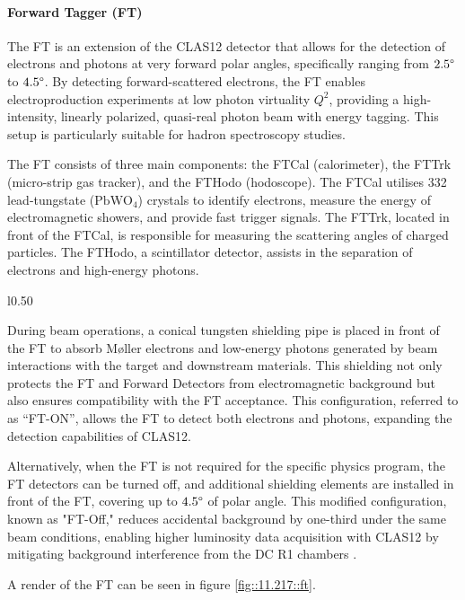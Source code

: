 \paragraph{Forward Tagger (FT)}
    The FT is an extension of the CLAS12 detector that allows for the detection of electrons and photons at very forward polar angles, specifically ranging from $2.5\degree$ to $4.5\degree$.
    By detecting forward-scattered electrons, the FT enables electroproduction experiments at low photon virtuality $Q^2$, providing a high-intensity, linearly polarized, quasi-real photon beam with energy tagging.
    This setup is particularly suitable for hadron spectroscopy studies.

    The FT consists of three main components: the FTCal (calorimeter), the FTTrk (micro-strip gas tracker), and the FTHodo (hodoscope).
    The FTCal utilises 332 lead-tungstate ($\text{PbWO}_4$) crystals to identify electrons, measure the energy of electromagnetic showers, and provide fast trigger signals.
    The FTTrk, located in front of the FTCal, is responsible for measuring the scattering angles of charged particles.
    The FTHodo, a scintillator detector, assists in the separation of electrons and high-energy photons.

        \begin{wrapfigure}{l}{0.50\textwidth}
            \centering{}
            \caption[FT]{The Forward Tagger system circled downstream of the CD in front of the torus magnet warm bore entrance.
            Source: \hyperlink{jlab.org/physics/hall-b/clas12}{CLAS12 wiki}.}
            \label{fig::11.217::ft}
        \end{wrapfigure}

    During beam operations, a conical tungsten shielding pipe is placed in front of the FT to absorb M\o ller electrons and low-energy photons generated by beam interactions with the target and downstream materials.
    This shielding not only protects the FT and Forward Detectors from electromagnetic background but also ensures compatibility with the FT acceptance.
    This configuration, referred to as ``FT-ON'', allows the FT to detect both electrons and photons, expanding the detection capabilities of CLAS12.

    Alternatively, when the FT is not required for the specific physics program, the FT detectors can be turned off, and additional shielding elements are installed in front of the FT, covering up to $4.5\degree$ of polar angle.
    This modified configuration, known as "FT-Off," reduces accidental background by one-third under the same beam conditions, enabling higher luminosity data acquisition with CLAS12 by mitigating background interference from the DC R1 chambers \cite{acker2020ft}.

    A render of the FT can be seen in figure \ref{fig::11.217::ft}.
